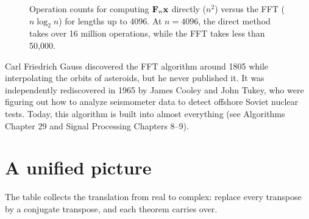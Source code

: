 \begin{figure}[htbp]
\centering
{}
\caption{Operation counts for computing $\mathbf{F}_n \mathbf{x}$ directly ($n^2$) versus the FFT ($n \log_2 n$) for lengths up to 4096. At $n=4096$, the direct method takes over 16 million operations, while the FFT takes less than 50,000.}
\label{ch32:fftcost}
\end{figure}

\begin{historybox}
Carl Friedrich Gauss discovered the FFT algorithm around 1805 while interpolating the orbits of asteroids, but he never published it. It was independently rediscovered in 1965 by James Cooley and John Tukey, who were figuring out how to analyze seismometer data to detect offshore Soviet nuclear tests. Today, this algorithm is built into almost everything (see Algorithms Chapter 29 and Signal Processing Chapters 8--9).
\end{historybox}

\section{A unified picture}

The table collects the translation from real to complex: replace every transpose
by a conjugate transpose, and each theorem carries over.

